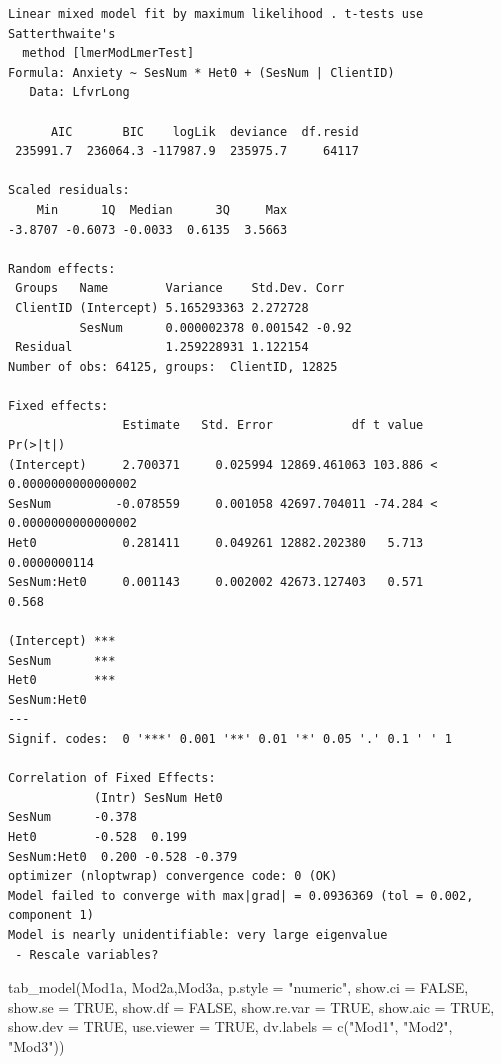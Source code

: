 \documentclass[
  11pt,
]{book}
\newenvironment{Shaded}{\begin{snugshade}}{\end{snugshade}}
\newcommand{\AttributeTok}[1]{\textcolor[rgb]{0.77,0.63,0.00}{#1}}
\newcommand{\ConstantTok}[1]{\textcolor[rgb]{0.00,0.00,0.00}{#1}}
\newcommand{\FunctionTok}[1]{\textcolor[rgb]{0.00,0.00,0.00}{#1}}
\newcommand{\NormalTok}[1]{#1}
\newcommand{\StringTok}[1]{\textcolor[rgb]{0.31,0.60,0.02}{#1}}
\begin{document}
\begin{verbatim}
Linear mixed model fit by maximum likelihood . t-tests use Satterthwaite's
  method [lmerModLmerTest]
Formula: Anxiety ~ SesNum * Het0 + (SesNum | ClientID)
   Data: LfvrLong

      AIC       BIC    logLik  deviance  df.resid 
 235991.7  236064.3 -117987.9  235975.7     64117 

Scaled residuals: 
    Min      1Q  Median      3Q     Max 
-3.8707 -0.6073 -0.0033  0.6135  3.5663 

Random effects:
 Groups   Name        Variance    Std.Dev. Corr 
 ClientID (Intercept) 5.165293363 2.272728      
          SesNum      0.000002378 0.001542 -0.92
 Residual             1.259228931 1.122154      
Number of obs: 64125, groups:  ClientID, 12825

Fixed effects:
                Estimate   Std. Error           df t value             Pr(>|t|)
(Intercept)     2.700371     0.025994 12869.461063 103.886 < 0.0000000000000002
SesNum         -0.078559     0.001058 42697.704011 -74.284 < 0.0000000000000002
Het0            0.281411     0.049261 12882.202380   5.713         0.0000000114
SesNum:Het0     0.001143     0.002002 42673.127403   0.571                0.568
               
(Intercept) ***
SesNum      ***
Het0        ***
SesNum:Het0    
---
Signif. codes:  0 '***' 0.001 '**' 0.01 '*' 0.05 '.' 0.1 ' ' 1

Correlation of Fixed Effects:
            (Intr) SesNum Het0  
SesNum      -0.378              
Het0        -0.528  0.199       
SesNum:Het0  0.200 -0.528 -0.379
optimizer (nloptwrap) convergence code: 0 (OK)
Model failed to converge with max|grad| = 0.0936369 (tol = 0.002, component 1)
Model is nearly unidentifiable: very large eigenvalue
 - Rescale variables?
\end{verbatim}

\begin{Shaded}
\begin{Highlighting}[]
\FunctionTok{tab\_model}\NormalTok{(Mod1a, Mod2a,Mod3a, }\AttributeTok{p.style =} \StringTok{"numeric"}\NormalTok{, }\AttributeTok{show.ci =} \ConstantTok{FALSE}\NormalTok{, }\AttributeTok{show.se =} \ConstantTok{TRUE}\NormalTok{, }\AttributeTok{show.df =} \ConstantTok{FALSE}\NormalTok{, }\AttributeTok{show.re.var =} \ConstantTok{TRUE}\NormalTok{, }\AttributeTok{show.aic =} \ConstantTok{TRUE}\NormalTok{, }\AttributeTok{show.dev =} \ConstantTok{TRUE}\NormalTok{, }\AttributeTok{use.viewer =} \ConstantTok{TRUE}\NormalTok{, }\AttributeTok{dv.labels =} \FunctionTok{c}\NormalTok{(}\StringTok{"Mod1"}\NormalTok{, }\StringTok{"Mod2"}\NormalTok{, }\StringTok{"Mod3"}\NormalTok{))}
\end{Highlighting}
\end{Shaded}
\end{document}
